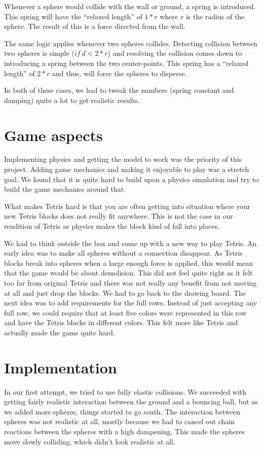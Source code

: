 \documentclass[11pt]{article} %
\begin{document}
Whenever a sphere would collide with the wall or ground, a spring is introduced. This spring will have the ``relaxed length'' of $1 * r$ where $r$ is the radius of the sphere. The result of this is a force directed from the wall.

The same logic applies whenever two spheres collides. Detecting collision between two spheres is simple ($if~d < 2 * r$) and resolving the collision comes down to introducing a spring between the two center-points. This spring has a ``relaxed length'' of $2 * r$ and thus, will force the spheres to disperse.

In both of these cases, we had to tweak the numbers (spring constant and damping) quite a lot to get realistic results.
\section{Game aspects}
Implementing physics and getting the model to work was the priority of this project. Adding game mechanics and making it enjoyable to play was a stretch goal. We found that it is quite hard to build upon a physics simulation and try to build the game mechanics around that.

What makes Tetris hard is that you are often getting into situation where your new Tetris blocks does not really fit anywhere. This is not the case in our rendition of Tetris as physics makes the block kind of fall into places.

We had to think outside the box and come up with a new way to play Tetris. An early idea was to make all spheres without a connection disappear. As Tetris blocks break into spheres when a large enough force is applied, this would mean that the game would be about demolision. This did not feel quite right as it felt too far from original Tetris and there was not really any benefit from not moving at all and just drop the blocks. We had to go back to the drawing board. The next idea was to add requirements for the full rows. Instead of just accepting any full row, we could require that at least five colors were represented in this row and have the Tetris blocks in different colors. This felt more like Tetris and actually made the game quite hard. 

\section{Implementation}
In our first attempt, we tried to use fully elastic collisions. We succeeded with getting fairly realistic interaction between the ground and a bouncing ball, but as we added more spheres, things started to go south. The interaction between spheres was not realistic at all, mostly because we had to cancel out chain reactions between the spheres with a high dampening. This made the spheres move slowly colliding, which didn't look realistic at all.
\end{document}
